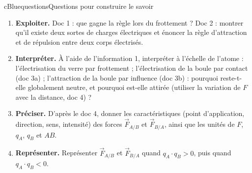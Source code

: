 \documentclass[11pt,a4paper]{article}
\newcommand{\vect}[1]{\overrightarrow{#1}}
\newcommand{\kw}[1]{{\sffamily\bfseries\color{cBlue}#1}}   %
\begin{document}
\begin{rub}{cBlue}{questions}{Questions pour construire le savoir}
\begin{enumerate}
  \item \kw{Exploiter.} Doc 1 : que gagne la règle lors du frottement ? Doc 2 : montrer qu’il existe deux sortes de charges électriques et énoncer la règle d’attraction et de répulsion entre deux corps électrisés.
  \item \kw{Interpréter.} À l’aide de l’information 1, interpréter à l’échelle de l’atome : l’électrisation du verre par frottement ; l’électrisation de la boule par contact (doc 3a) ; l’attraction de la boule par influence (doc 3b) : pourquoi reste-t-elle globalement neutre, et pourquoi est-elle attirée (utiliser la variation de $F$ avec la distance, doc 4) ?
  \item \kw{Préciser.} D’après le doc 4, donner les caractéristiques (point d’application, direction, sens, intensité) des forces $\vect{F}_{A/B}$ et $\vect{F}_{B/A}$, ainsi que les unités de $F$, $q_A$, $q_B$ et $AB$.
  \item \kw{Représenter.} Représenter $\vect{F}_{A/B}$ et $\vect{F}_{B/A}$ quand $q_A\cdot q_B > 0$, puis quand $q_A\cdot q_B < 0$.
\end{enumerate}
\end{rub}
\end{document}
